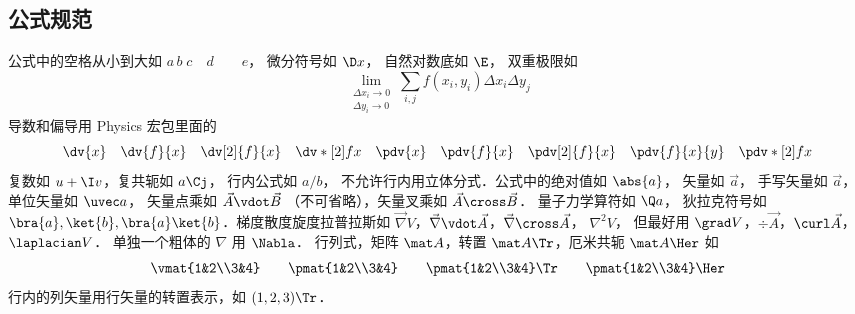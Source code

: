 \subsection{公式规范}
公式中的空格从小到大如 $a\, b\; c\quad d\qquad e$， 微分符号如 $\D x$， 自然对数底如 $\E$， 双重极限如
\begin{equation}
\lim_{\substack{\Delta x_i\to 0\\ \Delta y_i\to 0}} \sum_{i, j} f(x_i,y_i) \Delta x_i \Delta y_j
\end{equation}
导数和偏导用 Physics 宏包里面的
\begin{equation}
\dv{x} \quad \dv{f}{x} \quad \dv[2]{f}{x} \quad \dv*[2]{f}{x} \quad
\pdv{x} \quad \pdv{f}{x} \quad \pdv[2]{f}{x} \quad \pdv{f}{x}{y} \quad \pdv*[2]{f}{x}
\end{equation}
复数如 $u+\I v$，复共轭如 $a\Cj$，  行内公式如 $a/b$， 不允许行内用立体分式．公式中的绝对值如 $\abs{a}$， 矢量如 $\vec a$， 手写矢量如 $\overrightarrow{a}$， 单位矢量如 $\uvec a$， 矢量点乘如 $\vec A \vdot \vec B$ （不可省略），矢量叉乘如 $\vec A\cross\vec B$． 量子力学算符如 $\Q a$， 狄拉克符号如 $\bra{a}, \ket{b}, \bra{a}\ket{b}$．梯度散度旋度拉普拉斯如 $\vec\nabla V$，$\vec\nabla\vdot\vec A$，$\vec\nabla\cross\vec A$，  $\nabla^2 V$， 但最好用 $\grad V$，$\div\vec A$，$\curl\vec A$，  $\laplacian V$． 单独一个粗体的 $\nabla$ 用 $\Nabla$． 行列式，矩阵 $\mat A$，转置 $\mat A \Tr$，厄米共轭 $\mat A \Her$ 如
\begin{equation}
\vmat{1&2\\3&4} \qquad 
\pmat{1&2\\3&4} \qquad 
\pmat{1&2\\3&4}\Tr \qquad
\pmat{1&2\\3&4}\Her
\end{equation}
行内的列矢量用行矢量的转置表示，如 $(1,2,3)\Tr$． 



